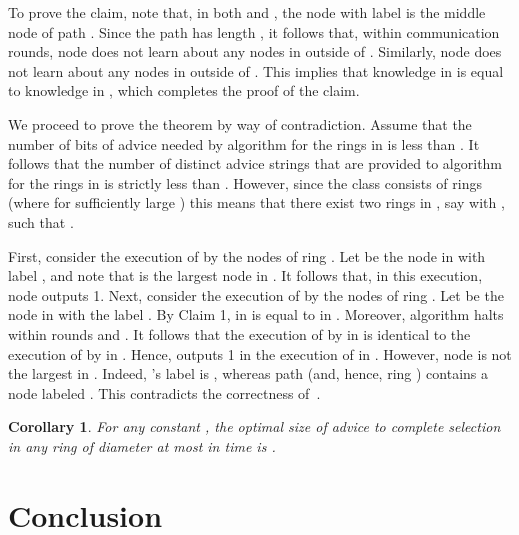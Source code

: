 \documentclass[11pt]{article}
\newtheorem{corollary}{Corollary}[section]
\newcommand{\qed}{\hfill  \bigbreak}
\newenvironment{proof}{\noindent {\bf Proof.}}{\qed}
\begin{document}
\begin{proof}
To prove the claim, note that, in both  and , the node with label  is the middle node of path . Since the path  has length , it follows that, within  communication rounds, node  does not learn about any nodes in  outside of . Similarly, node  does not learn about any nodes in  outside of . This implies that knowledge  in  is equal to knowledge  in , which completes the proof of the claim.

We proceed to prove the theorem by way of contradiction. Assume that the number of bits of advice needed by algorithm  for the rings in  is less than . It follows that the number of distinct advice strings that are provided to algorithm  for the rings in  is strictly less than . However, since the class  consists of  rings (where  for sufficiently large ) this means that there exist two rings in , say  with , such that .

First, consider the execution of  by the nodes of ring . Let  be the node in  with label , and note that  is the largest node in . It follows that, in this execution, node  outputs 1. Next, consider the execution of  by the nodes of ring . Let  be the node in  with the label . By Claim 1,  in  is equal to  in . Moreover, 
algorithm  halts within  rounds and . It follows that the execution of  by  in  is identical to the execution of  by  in . Hence,  outputs 1 in the execution of  in . However, node  is not the largest in . Indeed, 's label is , whereas path  (and, hence, ring ) contains a node labeled . This contradicts the correctness of~.
\end{proof}

\begin{corollary}
For any constant ,
the optimal size of advice to complete selection in any ring of diameter at most  in time   is .
\end{corollary} 








\section{Conclusion}
\end{document}
